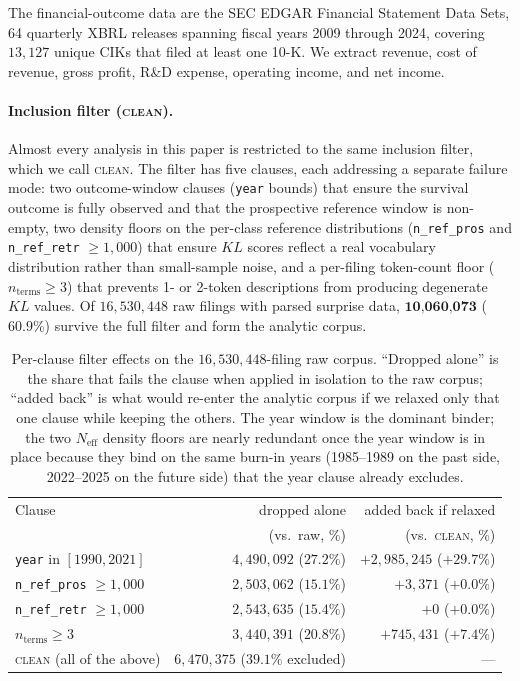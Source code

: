 \documentclass[11pt]{article}
\begin{document}
The financial-outcome data are the SEC EDGAR Financial Statement
Data Sets, 64 quarterly XBRL releases spanning fiscal years 2009
through 2024, covering $13{,}127$ unique CIKs that filed at least
one 10-K. We extract revenue, cost of revenue, gross profit, R\&D
expense, operating income, and net income.

\paragraph{Inclusion filter (\textsc{clean}).}
Almost every analysis in this paper is restricted to the same
inclusion filter, which we call \textsc{clean}. The filter has five
clauses, each addressing a separate failure mode: two outcome-window
clauses (\texttt{year} bounds) that ensure the survival outcome is
fully observed and that the prospective reference window is non-empty,
two density floors on the per-class reference distributions
(\texttt{n\_ref\_pros} and \texttt{n\_ref\_retr} $\geq 1{,}000$) that
ensure $KL$ scores reflect a real vocabulary distribution rather than
small-sample noise, and a per-filing token-count floor
($n_{\text{terms}} \geq 3$) that prevents 1- or 2-token descriptions
from producing degenerate $KL$ values. Of $16{,}530{,}448$ raw
filings with parsed surprise data, $\textbf{10{,}060{,}073}$
($60.9\%$) survive the full filter and form the analytic corpus.

\begin{table}[h]
\centering
\small
\begin{tabular}{lrr}
\toprule
Clause & dropped alone & added back if relaxed \\
       & (vs.\ raw, \%)& (vs.\ \textsc{clean}, \%) \\
\midrule
\texttt{year} in $[1990, 2021]$      & $4{,}490{,}092$ ($27.2\%$)  & $+2{,}985{,}245$ ($+29.7\%$) \\
\texttt{n\_ref\_pros} $\geq 1{,}000$ & $2{,}503{,}062$ ($15.1\%$)  & $+3{,}371$ ($+0.0\%$) \\
\texttt{n\_ref\_retr} $\geq 1{,}000$ & $2{,}543{,}635$ ($15.4\%$)  & $+0$ ($+0.0\%$) \\
$n_{\text{terms}} \geq 3$           & $3{,}440{,}391$ ($20.8\%$)  & $+745{,}431$ ($+7.4\%$) \\
\midrule
\textsc{clean} (all of the above)   & $6{,}470{,}375$ ($39.1\%$ excluded) & --- \\
\bottomrule
\end{tabular}
\caption{Per-clause filter effects on the $16{,}530{,}448$-filing raw
corpus. ``Dropped alone'' is the share that fails the clause when
applied in isolation to the raw corpus; ``added back'' is what would
re-enter the analytic corpus if we relaxed only that one clause while
keeping the others. The year window is the dominant binder; the two
$N_{\text{eff}}$ density floors are nearly redundant once the year
window is in place because they bind on the same burn-in years
(1985--1989 on the past side, 2022--2025 on the future side) that
the year clause already excludes.}
\label{tab:clean-filter}
\end{table}
\end{document}

